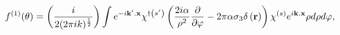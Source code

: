 \begin{equation}
f^{\left( 1\right) }(\theta )=\left( \frac{i}{2(2\pi ik)^{\frac{1}{2}}}%
\right) \int e^{-i\mathbf{k}^{\prime }.\mathbf{x}}\chi ^{\dagger \left(
s^{\prime }\right) }\left( \frac{2i\alpha }{\rho ^{2}}\frac{\partial }{%
\partial \varphi }-2\pi \alpha \sigma _{3}\delta \left( \mathbf{r}\right)
\right) \chi ^{\left( s\right) }e^{i\mathbf{k}.\mathbf{x}}\rho d\rho
d\varphi ,
\end{equation}

